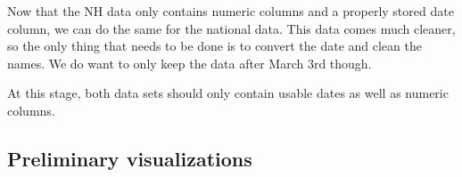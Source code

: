 \documentclass[
]{article}
\newenvironment{Shaded}{\begin{snugshade}}{\end{snugshade}}
\newcommand{\KeywordTok}[1]{\textcolor[rgb]{0.13,0.29,0.53}{\textbf{#1}}}
\newcommand{\NormalTok}[1]{#1}
\newcommand{\OperatorTok}[1]{\textcolor[rgb]{0.81,0.36,0.00}{\textbf{#1}}}
\newcommand{\StringTok}[1]{\textcolor[rgb]{0.31,0.60,0.02}{#1}}
\begin{document}
\begin{Shaded}
\end{Shaded}

Now that the NH data only contains numeric columns and a properly stored
date column, we can do the same for the national data. This data comes
much cleaner, so the only thing that needs to be done is to convert the
date and clean the names. We do want to only keep the data after March
3rd though.

\begin{Shaded}
\end{Shaded}

At this stage, both data sets should only contain usable dates as well
as numeric columns.

\hypertarget{preliminary-visualizations}{%
\subsection{Preliminary
visualizations}\label{preliminary-visualizations}}
\end{document}
